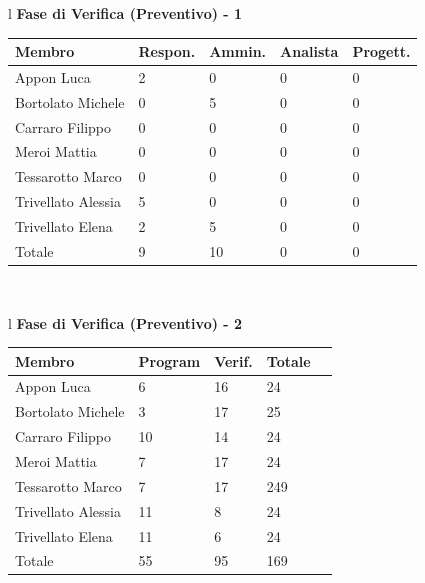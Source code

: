 \documentclass[11pt,titlepage,a4paper]{report}
\begin{document}
\begin{table}[hbtp]
\large{
\begin{tabular}{l}
\Large{\textbf{\textsf{Fase di Verifica (Preventivo) - 1}}} \\
\begin{tabular}{||p{3.5cm}||p{2cm}||p{2cm}||p{2cm}||p{2cm}||} \hline
\textbf{Membro} & \textbf{Respon.} & \textbf{Ammin.} & \textbf{Analista} & \textbf{Progett.}\\ \hline
{Appon Luca}&2&0&0&0 \\ \hline 
{Bortolato Michele} &0&5&0&0\\ \hline
{Carraro Filippo}&0&0&0&0 \\ \hline
{Meroi Mattia}&0&0&0&0\\ \hline
{Tessarotto Marco} &0&0&0&0\\ \hline
{Trivellato Alessia} &5&0&0&0 \\ \hline
{Trivellato Elena} &2&5&0&0 \\ \hline
{Totale}& 9&10&0&0 \\ \hline
\end{tabular} \\
\end{tabular}
}
\end{table}

\begin{table}[hbtp]
\large{
\begin{tabular}{l}
\Large{\textbf{\textsf{Fase di Verifica (Preventivo) - 2}}} \\
\begin{tabular}{||p{3.5cm}||p{2cm}||p{2cm}||p{2cm}||p{2cm}||} \hline
\textbf{Membro} & \textbf{Program} & \textbf{Verif.} & \textbf{Totale}\\ \hline
{Appon Luca}&6&16&24 \\ \hline
{Bortolato Michele} &3&17&25\\ \hline
{Carraro Filippo}&10&14&24 \\ \hline
{Meroi Mattia}&7&17&24\\ \hline
{Tessarotto Marco} &7&17&249\\ \hline
{Trivellato Alessia} &11&8&24 \\ \hline
{Trivellato Elena} &11&6&24 \\ \hline
{Totale} &55&95&169 \\ \hline
\end{tabular} \\
\end{tabular}
}
\end{table}
\end{document}
